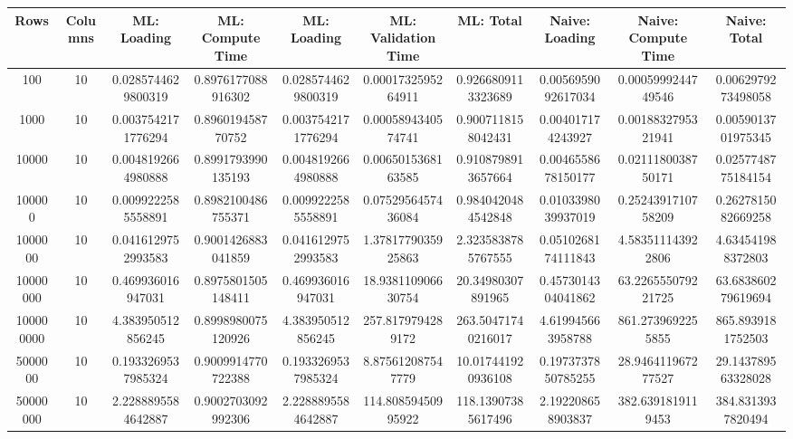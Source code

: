 \begin{table}[htb]
    \centering
    \begin{tabular}{@{}cccccccccc@{}}
        \toprule
        Rows & Columns & ML: Loading & ML: Compute Time & ML: Loading & ML: Validation Time & ML: Total & Naive: Loading & Naive: Compute Time & Naive: Total \\
        \midrule
        100 & 10 & 0.0285744629800319 & 0.8976177088916302 & 0.0285744629800319 & 0.0001732595264911 & 0.9266809113323689 & 0.0056959092617034 & 0.0005999244749546 & 0.0062979273498058 \\
        1000 & 10 & 0.0037542171776294 & 0.896019458770752 & 0.0037542171776294 & 0.0005894340574741 & 0.9007118158042431 & 0.004017174243927 & 0.0018832795321941 & 0.0059013701975345 \\
        10000 & 10 & 0.0048192664980888 & 0.8991793990135193 & 0.0048192664980888 & 0.0065015368163585 & 0.9108798913657664 & 0.0046558678150177 & 0.0211180038750171 & 0.0257748775184154 \\
        100000 & 10 & 0.0099222585558891 & 0.8982100486755371 & 0.0099222585558891 & 0.0752956457436084 & 0.9840420484542848 & 0.0103398039937019 & 0.2524391710758209 & 0.2627815082669258 \\
        1000000 & 10 & 0.0416129752993583 & 0.9001426883041859 & 0.0416129752993583 & 1.3781779035925863 & 2.3235838785767555 & 0.0510268174111843 & 4.583511143922806 & 4.634541988372803 \\
        10000000 & 10 & 0.469936016947031 & 0.8975801505148411 & 0.469936016947031 & 18.938110906630754 & 20.34980307891965 & 0.4573014304041862 & 63.226555079221725 & 63.683860279619694 \\
        100000000 & 10 & 4.383950512856245 & 0.8998980075120926 & 4.383950512856245 & 257.8179794289172 & 263.50471740216017 & 4.619945663958788 & 861.2739692255855 & 865.8939181752503 \\
        5000000 & 10 & 0.1933269537985324 & 0.9009914770722388 & 0.1933269537985324 & 8.875612087547779 & 10.017441920936108 & 0.1973737850785255 & 28.946411967277527 & 29.143789563328028 \\
        50000000 & 10 & 2.2288895584642887 & 0.9002703092992306 & 2.2288895584642887 & 114.80859450995922 & 118.13907385617496 & 2.192208658903837 & 382.6391819119453 & 384.8313937820494 \\
        \bottomrule
    \end{tabular}
\end{table}